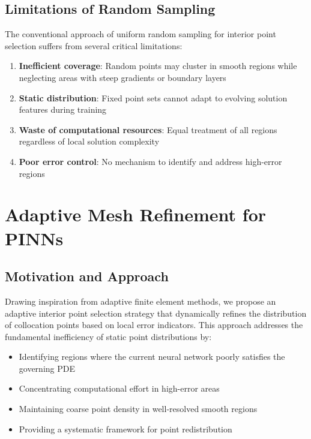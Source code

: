 \documentclass[11pt,a4paper]{article}
\begin{document}
\subsection{Limitations of Random Sampling}

The conventional approach of uniform random sampling for interior point selection suffers from several critical limitations:

\begin{enumerate}
    \item \textbf{Inefficient coverage}: Random points may cluster in smooth regions while neglecting areas with steep gradients or boundary layers
    \item \textbf{Static distribution}: Fixed point sets cannot adapt to evolving solution features during training
    \item \textbf{Waste of computational resources}: Equal treatment of all regions regardless of local solution complexity
    \item \textbf{Poor error control}: No mechanism to identify and address high-error regions
\end{enumerate}

\section{Adaptive Mesh Refinement for PINNs}

\subsection{Motivation and Approach}

Drawing inspiration from adaptive finite element methods, we propose an adaptive interior point selection strategy that dynamically refines the distribution of collocation points based on local error indicators. This approach addresses the fundamental inefficiency of static point distributions by:

\begin{itemize}
    \item Identifying regions where the current neural network poorly satisfies the governing PDE
    \item Concentrating computational effort in high-error areas
    \item Maintaining coarse point density in well-resolved smooth regions
    \item Providing a systematic framework for point redistribution
\end{itemize}
\end{document}
